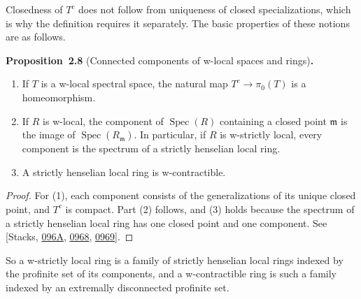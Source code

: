 \documentclass[11pt]{article}
\newenvironment{bpstatement}[2]{\par\addvspace{0.6\baselineskip}\noindent\textbf{#1}#2\textbf{.}\enspace\ignorespaces}
  {\par\addvspace{0.4\baselineskip}}
\newenvironment{bpstatementit}[2]{\begin{bpstatement}{#1}{#2}\itshape\ignorespaces}{\end{bpstatement}}
\begin{document}
\label{bp22}%
Closedness of \(T^c\) does not follow from uniqueness of closed specializations, which is why the definition requires it separately. The basic properties of these notions are as follows.

\label{bp23}%
\begin{bpstatementit}{Proposition~2.8}{ (Connected components of w-local spaces and rings)}
\begin{enumerate}
\item If \(T\) is a w-local spectral space, the natural map \(T^c\to\pi_0(T)\) is a homeomorphism.
\item If \(R\) is w-local, the component of \(\operatorname{Spec}(R)\) containing a closed point \(\mathfrak m\) is the image of \(\operatorname{Spec}(R_{\mathfrak m})\). In particular, if \(R\) is w-strictly local, every component is the spectrum of a strictly henselian local ring.
\item A strictly henselian local ring is w-contractible.
\end{enumerate}
\end{bpstatementit}

\begin{proof}[{Proof}]\label{bp24}%
For (1), each component consists of the generalizations of its unique closed point, and \(T^c\) is compact. Part (2) follows, and (3) holds because the spectrum of a strictly henselian local ring has one closed point and one component. See [Stacks, \href{https://stacks.math.columbia.edu/tag/096A}{096A}, \href{https://stacks.math.columbia.edu/tag/0968}{0968}, \href{https://stacks.math.columbia.edu/tag/0969}{0969}].
\end{proof}

\label{bp25}%
So a w-strictly local ring is a family of strictly henselian local rings indexed by the profinite set of its components, and a w-contractible ring is such a family indexed by an extremally disconnected profinite set.
\end{document}
